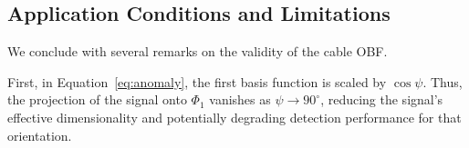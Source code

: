 \subsection{Application Conditions and Limitations}
We conclude with several remarks on the validity of the cable OBF.

First, in Equation~\ref{eq:anomaly}, the first basis function is scaled by \(\cos\psi\). Thus, the projection of the signal onto \(\Phi_1\) vanishes as \(\psi \rightarrow 90^\circ\), reducing the signal’s effective dimensionality and potentially degrading detection performance for that orientation.


